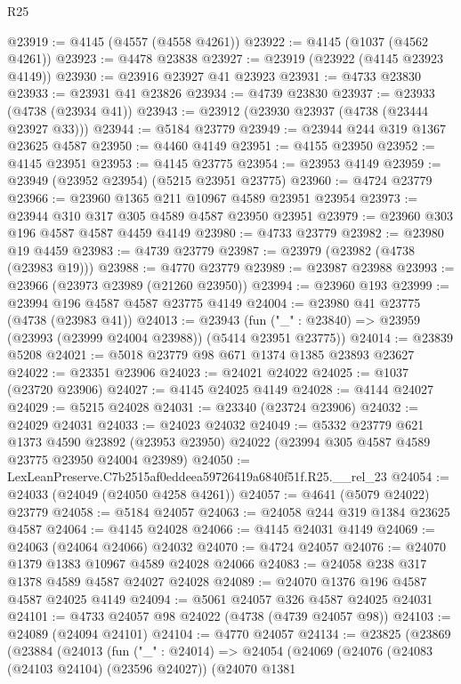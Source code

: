 \begin{lexlean}{R25}
\begin{coremodule}
@23919 := @4145 (@4557 (@4558 @4261))
@23922 := @4145 (@1037 (@4562 @4261))
@23923 := @4478 @23838
@23927 := @23919 (@23922 (@4145 @23923 @4149))
@23930 := @23916 @23927 @41 @23923
@23931 := @4733 @23830
@23933 := @23931 @41 @23826
@23934 := @4739 @23830
@23937 := @23933 (@4738 (@23934 @41))
@23943 := @23912 (@23930 @23937 (@4738 (@23444 @23927 @33)))
@23944 := @5184 @23779
@23949 := @23944 @244 @319 @1367 @23625 @4587
@23950 := @4460 @4149
@23951 := @4155 @23950
@23952 := @4145 @23951
@23953 := @4145 @23775
@23954 := @23953 @4149
@23959 := @23949 (@23952 @23954) (@5215 @23951 @23775)
@23960 := @4724 @23779
@23966 := @23960 @1365 @211 @10967 @4589 @23951 @23954
@23973 := @23944 @310 @317 @305 @4589 @4587 @23950 @23951
@23979 := @23960 @303 @196 @4587 @4587 @4459 @4149
@23980 := @4733 @23779
@23982 := @23980 @19 @4459
@23983 := @4739 @23779
@23987 := @23979 (@23982 (@4738 (@23983 @19)))
@23988 := @4770 @23779
@23989 := @23987 @23988
@23993 := @23966 (@23973 @23989 (@21260 @23950))
@23994 := @23960 @193
@23999 := @23994 @196 @4587 @4587 @23775 @4149
@24004 := @23980 @41 @23775 (@4738 (@23983 @41))
@24013 := @23943
    (fun ("_" : @23840) => @23959 (@23993 (@23999 @24004 @23988)) (@5414 @23951 @23775))
@24014 := @23839 @5208
@24021 := @5018 @23779 @98 @671 @1374 @1385 @23893 @23627
@24022 := @23351 @23906
@24023 := @24021 @24022
@24025 := @1037 (@23720 @23906)
@24027 := @4145 @24025 @4149
@24028 := @4144 @24027
@24029 := @5215 @24028
@24031 := @23340 (@23724 @23906)
@24032 := @24029 @24031
@24033 := @24023 @24032
@24049 := @5332
    @23779
    @621
    @1373
    @4590
    @23892
    (@23953 @23950)
    @24022
    (@23994 @305 @4587 @4589 @23775 @23950 @24004 @23989)
@24050 := LexLeanPreserve.C7b2515af0eddeea59726419a6840f51f.R25.__rel_23
@24054 := @24033 (@24049 (@24050 @4258 @4261))
@24057 := @4641 (@5079 @24022) @23779
@24058 := @5184 @24057
@24063 := @24058 @244 @319 @1384 @23625 @4587
@24064 := @4145 @24028
@24066 := @4145 @24031 @4149
@24069 := @24063 (@24064 @24066) @24032
@24070 := @4724 @24057
@24076 := @24070 @1379 @1383 @10967 @4589 @24028 @24066
@24083 := @24058 @238 @317 @1378 @4589 @4587 @24027 @24028
@24089 := @24070 @1376 @196 @4587 @4587 @24025 @4149
@24094 := @5061 @24057 @326 @4587 @24025 @24031
@24101 := @4733 @24057 @98 @24022 (@4738 (@4739 @24057 @98))
@24103 := @24089 (@24094 @24101)
@24104 := @4770 @24057
@24134 := @23825
    (@23869
      (@23884
        (@24013
          (fun ("_" : @24014) =>
          @24054
            (@24069
              (@24076
                (@24083 (@24103 @24104) (@23596 @24027))
                (@24070
                  @1381

\end{coremodule}
\end{lexlean}
